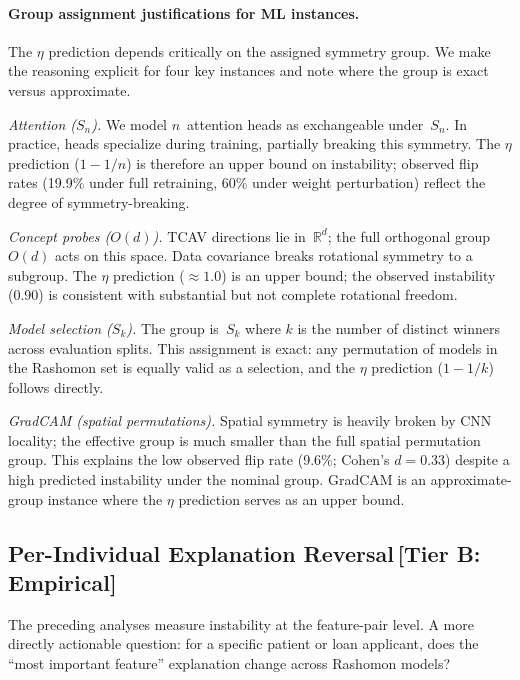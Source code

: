 \documentclass[11pt,a4paper]{article}
\begin{document}
\paragraph{Group assignment justifications for ML instances.}
The $\eta$ prediction depends critically on the assigned symmetry group.  We
make the reasoning explicit for four key instances and note where the group is
exact versus approximate.

\emph{Attention ($S_n$).}
We model $n$~attention heads as exchangeable under~$S_n$.  In practice, heads
specialize during training, partially breaking this symmetry.  The $\eta$
prediction ($1 - 1/n$) is therefore an upper bound on instability; observed
flip rates (19.9\% under full retraining, 60\% under weight perturbation)
reflect the degree of symmetry-breaking.

\emph{Concept probes ($O(d)$).}
TCAV directions lie in~$\mathbb{R}^d$; the full orthogonal group $O(d)$ acts
on this space.  Data covariance breaks rotational symmetry to a subgroup.  The
$\eta$ prediction ($\approx 1.0$) is an upper bound; the observed instability
(0.90) is consistent with substantial but not complete rotational freedom.

\emph{Model selection ($S_k$).}
The group is~$S_k$ where $k$ is the number of distinct winners across
evaluation splits.  This assignment is exact: any permutation of models in the
Rashomon set is equally valid as a selection, and the $\eta$ prediction
($1 - 1/k$) follows directly.

\emph{GradCAM (spatial permutations).}
Spatial symmetry is heavily broken by CNN locality; the effective group is much
smaller than the full spatial permutation group.  This explains the low
observed flip rate (9.6\%; Cohen's $d = 0.33$) despite a high predicted instability under the
nominal group.  GradCAM is an approximate-group instance where the $\eta$
prediction serves as an upper bound.

\subsection{Per-Individual Explanation Reversal\,\textnormal{\normalsize[Tier B: Empirical]}}
\label{sec:individual-reversal}

The preceding analyses measure instability at the feature-pair level. A more directly actionable question: for a specific patient or loan applicant, does the ``most important feature'' explanation change across Rashomon models?
\end{document}
